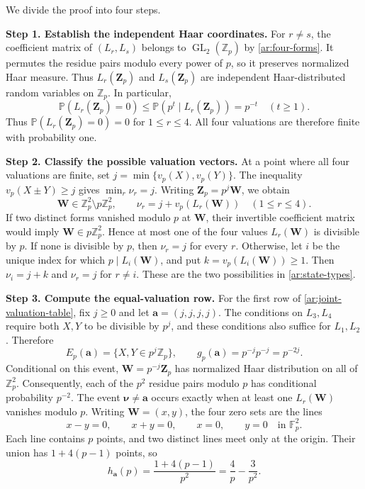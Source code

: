 \documentclass[twoside]{aomart}
\makeatletter
\theoremstyle{paperplain}
\theoremstyle{paperdefinition}
\renewenvironment{proof}[1][\proofname]{\par\pushQED{\qed}%
  \normalfont\topsep6\p@\@plus3\p@\relax\trivlist
  \item[\hskip\labelsep\itshape #1\@addpunct{.}]\ignorespaces
}{\popQED\endtrivlist\@endpefalse}
\newcommand{\Z}{\mathbb Z}
\newcommand{\Pp}{\mathbb P}
\numberwithin{equation}{section}
\makeatother
\begin{document}
\begin{proof}
We divide the proof into four steps.

\medskip
\noindent\textbf{Step 1. Establish the independent Haar coordinates.}
For $r\ne s$, the coefficient matrix of $(L_r,L_s)$ belongs
to $\operatorname{GL}_2(\Z_p)$ by \eqref{ar:four-forms}.
It permutes the residue pairs modulo every power of $p$,
so it preserves normalized Haar measure.
Thus $L_r(\mathbf Z_p)$ and $L_s(\mathbf Z_p)$ are independent
Haar-distributed random variables on $\Z_p$.
In particular,
\begin{equation*}
 \Pp(L_r(\mathbf Z_p)=0)
 \le\Pp(p^t\mid L_r(\mathbf Z_p))=p^{-t}
 \quad(t\ge1).
 \end{equation*}
Thus $\Pp(L_r(\mathbf Z_p)=0)=0$ for $1\le r\le4$.
All four valuations are therefore finite with probability one.

\medskip
\noindent\textbf{Step 2. Classify the possible valuation vectors.}
At a point where all four valuations are finite, set
$j=\min\{v_p(X),v_p(Y)\}$.
The inequality $v_p(X\pm Y)\ge j$ gives $\min_r\nu_r=j$.
Writing $\mathbf Z_p=p^j\mathbf W$, we obtain
\begin{equation*}
 \mathbf W\in\Z_p^2\setminus p\Z_p^2,\qquad
 \nu_r=j+v_p(L_r(\mathbf W))\quad(1\le r\le4).
 \end{equation*}
If two distinct forms vanished modulo $p$ at $\mathbf W$,
their invertible coefficient matrix would imply
$\mathbf W\in p\Z_p^2$.
Hence at most one of the four values $L_r(\mathbf W)$ is divisible
by $p$. If none is divisible by $p$, then $\nu_r=j$ for every $r$.
Otherwise, let $i$ be the unique index for which $p\mid L_i(\mathbf W)$,
and put $k=v_p(L_i(\mathbf W))\ge1$.
Then $\nu_i=j+k$ and $\nu_r=j$ for $r\ne i$.
These are the two possibilities in \eqref{ar:state-types}.

\medskip
\noindent\textbf{Step 3. Compute the equal-valuation row.}
For the first row of \eqref{ar:joint-valuation-table}, fix $j\ge0$ and
let $\mathbf a=(j,j,j,j)$.
The conditions on $L_3,L_4$ require both $X,Y$ to be divisible
by $p^j$, and these conditions also suffice for $L_1,L_2$.
Therefore
\begin{equation*}
 E_p(\mathbf a)=\{X,Y\in p^j\Z_p\},\qquad
 g_p(\mathbf a)=p^{-j}p^{-j}=p^{-2j}.
 \end{equation*}
Conditional on this event, $\mathbf W=p^{-j}\mathbf Z_p$ has
normalized Haar distribution on all of $\Z_p^2$.
Consequently, each of the $p^2$ residue pairs modulo $p$ has
conditional probability $p^{-2}$.
The event $\boldsymbol\nu\ne\mathbf a$ occurs exactly when
at least one $L_r(\mathbf W)$ vanishes modulo $p$.
Writing $\mathbf W=(x,y)$, the four zero sets are the lines
\begin{equation*}
 x-y=0,\qquad x+y=0,\qquad x=0,\qquad y=0
 \quad\text{in }\mathbb F_p^2.
 \end{equation*}
Each line contains $p$ points, and two distinct lines meet
only at the origin. Their union has $1+4(p-1)$ points, so
\begin{equation*}
 h_{\mathbf a}(p)=\frac{1+4(p-1)}{p^2}
 =\frac4p-\frac3{p^2}.
 \end{equation*}


\end{proof}
\end{document}
